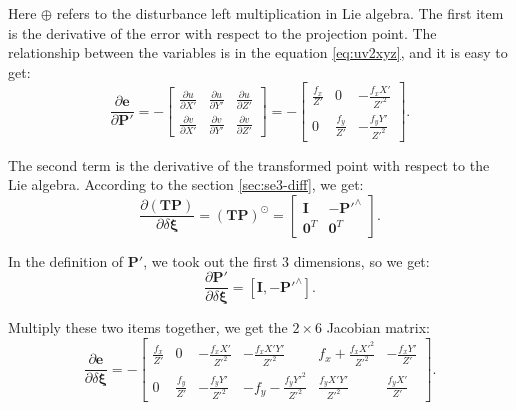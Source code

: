 Here $\oplus$ refers to the disturbance left multiplication in Lie algebra. The first item is the derivative of the error with respect to the projection point. The relationship between the variables is in the equation \eqref{eq:uv2xyz}, and it is easy to get:
\begin{equation}
\frac{{\partial \mathbf{e}}}{{\partial \mathbf{P}'}} = -\left[ 
{\begin{array}{*{20}{c}}
	{\frac{{\partial u}}{{\partial X'}}}&{\frac{{\partial u}}{{\partial Y'}}}&{\frac{{\partial u}}{{\partial Z'}}}\\
	{\frac{{\partial v}}{{\partial X'}}}&{\frac{{\partial v}}{{\partial Y'}}}&{\frac{{\partial v}}{{\partial Z'}}}
	\end{array}} \right] 
= - \left[ {\begin{array}{*{20}{c}}
	{\frac{{{f_x}}}{Z'}}&0&{ - \frac{{{f_x}X'}}{{{Z'^2}}}}\\
	0&{\frac{{{f_y}}}{Z'}}&{ - \frac{{{f_y}Y'}}{Z'^2}}
\end{array}} \right].
\end{equation}

The second term is the derivative of the transformed point with respect to the Lie algebra. According to the section \ref{sec:se3-diff}, we get:
\begin{equation}
\frac{{\partial \left( \mathbf{TP} \right)}}{{\partial \delta \boldsymbol{\xi} }} = {\left( \mathbf{TP} \right)^ \odot } = \left[ 
\begin{array}{*{20}{cc}}
\mathbf{I} &- \mathbf{P}'^ \wedge \\
\mathbf{0}^T &\mathbf{0}^T 
\end{array}
\right].
\end{equation}

In the definition of $\mathbf{P}'$, we took out the first 3 dimensions, so we get:
\begin{equation}
\frac{{\partial \mathbf{P}'}}{{\partial \delta \boldsymbol{\xi} }} = \left[ { \mathbf{I}, - {\mathbf{P}'^ \wedge }} \right].
\end{equation}

Multiply these two items together, we get the $2 \times 6$ Jacobian matrix:
\begin{equation}
\label{eq:jacob-uv2xi}
\frac{{\partial \mathbf{e}}}{{\partial \delta \boldsymbol{\xi} }} = - \left[ {\begin{array}{*{20}{c}}
	{\frac{{{f_x}}}{Z'}}&0&{ - \frac{{{f_x}X'}}{{{Z'^2}}}}&{ - \frac{{{f_x}X'Y'}}{{{Z'^2}}}}&{{f_x} + \frac{{{f_x}{X'^2}}}{{{Z'^2}}}}&{ - \frac{{{f_x}Y'}}{Z'}}\\
	0&{\frac{{{f_y}}}{Z'}}&{ - \frac{{{f_y}Y'}}{{{Z'^2}}}}&{ - {f_y} - \frac{{{f_y}{Y'^2}}}{{{Z'^2}}}}&{\frac{{{f_y}X'Y'}}{{{Z'^2}}}}&{\frac{{{f_y}X'}}{Z'}}
	\end{array}} \right].
\end{equation}

